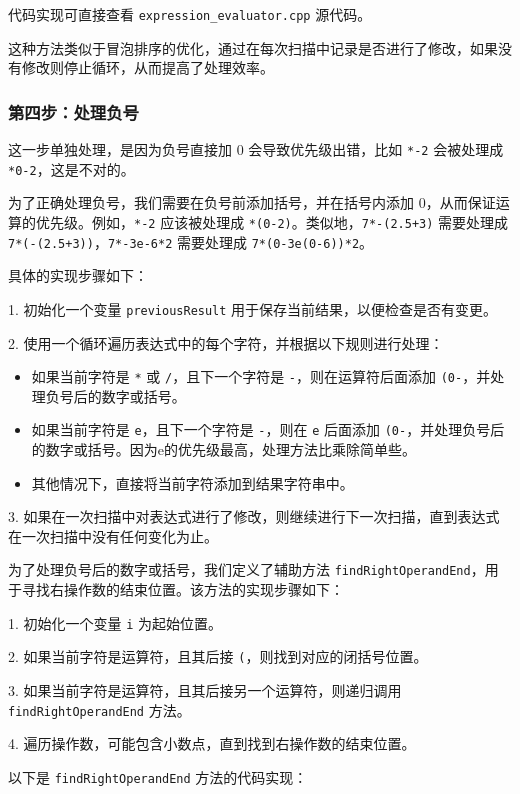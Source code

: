 \documentclass[UTF8]{ctexart}
\begin{document}
代码实现可直接查看 \texttt{expression\_evaluator.cpp} 源代码。

这种方法类似于冒泡排序的优化，通过在每次扫描中记录是否进行了修改，如果没有修改则停止循环，从而提高了处理效率。

\subsubsection{第四步：处理负号}

这一步单独处理，是因为负号直接加 0 会导致优先级出错，比如 \texttt{*-2} 会被处理成 \texttt{*0-2}，这是不对的。

为了正确处理负号，我们需要在负号前添加括号，并在括号内添加 0，从而保证运算的优先级。例如，\texttt{*-2} 应该被处理成 \texttt{*(0-2)}。类似地，\texttt{7*-(2.5+3)} 需要处理成 \texttt{7*(-(2.5+3))}，\texttt{7*-3e-6*2} 需要处理成 \texttt{7*(0-3e(0-6))*2}。

具体的实现步骤如下：

1. 初始化一个变量 \texttt{previousResult} 用于保存当前结果，以便检查是否有变更。

2. 使用一个循环遍历表达式中的每个字符，并根据以下规则进行处理：
   \begin{itemize}
     \item 如果当前字符是 \texttt{*} 或 \texttt{/}，且下一个字符是 \texttt{-}，则在运算符后面添加 \texttt{(0-}，并处理负号后的数字或括号。
     \item 如果当前字符是 \texttt{e}，且下一个字符是 \texttt{-}，则在 \texttt{e} 后面添加 \texttt{(0-}，并处理负号后的数字或括号。因为e的优先级最高，处理方法比乘除简单些。
     \item 其他情况下，直接将当前字符添加到结果字符串中。
   \end{itemize}
3. 如果在一次扫描中对表达式进行了修改，则继续进行下一次扫描，直到表达式在一次扫描中没有任何变化为止。

为了处理负号后的数字或括号，我们定义了辅助方法 \texttt{findRightOperandEnd}，用于寻找右操作数的结束位置。该方法的实现步骤如下：

1. 初始化一个变量 \texttt{i} 为起始位置。

2. 如果当前字符是运算符，且其后接 \texttt{(}，则找到对应的闭括号位置。

3. 如果当前字符是运算符，且其后接另一个运算符，则递归调用 \texttt{findRightOperandEnd} 方法。

4. 遍历操作数，可能包含小数点，直到找到右操作数的结束位置。

以下是 \texttt{findRightOperandEnd} 方法的代码实现：
\end{document}
